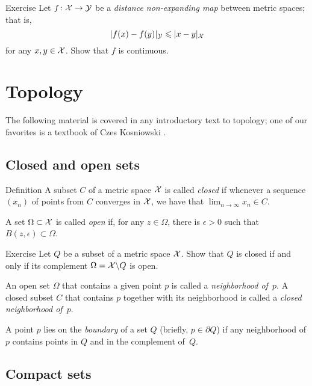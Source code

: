 \begin{thm}{Exercise}\label{ex:shrt=>continuous}
Let $f\colon\mathcal{X}\to \mathcal{Y}$ be a {}\emph{distance non-expanding map} between metric spaces; that is, 
\[\dist{f(x)}{f(y)}{\spc{Y}}\le \dist{x}{y}{\spc{X}}\]
for any $x,y\in \mathcal{X}$.
Show that $f$ is continuous.
\end{thm}

\section{Topology}\label{sec:topology}

The following material is covered in any introductory text to topology; 
one of our favorites is a textbook of Czes Kosniowski \cite{kosniowski}.

\subsection*{Closed and open sets}

\begin{thm}{Definition}
A subset $C$ of a metric space $\mathcal{X}$ is called \emph{closed} if whenever a sequence $(x_n)$ of points from $C$ converges in $\mathcal{X}$, we have that $\lim_{n\to\infty} x_n \in C$.

A set $\Omega \subset \mathcal{X}$ is called \emph{open} if, for any $z\in \Omega$, 
there is $\epsilon>0$ such that $B(z,\epsilon)\subset\Omega$.
\end{thm}

\begin{thm}{Exercise}\label{ex:close-open}
Let $Q$ be a subset of a metric space $\mathcal{X}$.
Show that $Q$ is closed if and only if its complement $\Omega=\mathcal{X}\backslash Q$ is open.
\end{thm}

An open set $\Omega$ that contains a given point $p$ is called a \emph{neighborhood of~$p$}.
A closed subset $C$ that contains $p$ together with its neighborhood is called a {}\emph{closed neighborhood of~$p$}.

A point $p$ lies on the \emph{boundary} of a set $Q$ (briefly, $p\in\partial Q$) if any neighborhood of $p$ contains points in $Q$ and in the complement of~$Q$.

\subsection*{Compact sets}

